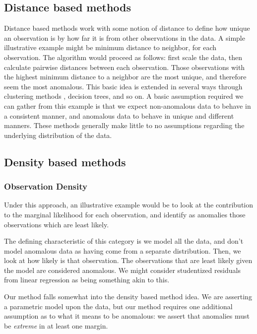 \subsection{Distance based methods}
Distance based methods work with some notion of distance to define how unique an
  observation is by how far it is from other observations in the data.  A simple
  illustrative example might be minimum distance to neighbor, for each
  observation.  The algorithm would proceed as follows: first scale the data,
  then calculate pairwise distances between each observation. Those observations
  with the highest minimum distance to a neighbor are the most unique, and
  therefore seem the most anomalous.   This basic idea is extended in several ways through
  clustering methods , decision
  trees, and so on.  A basic
  assumption required we can gather from this example is that we expect
  non-anomalous data to behave in a consistent manner, and anomalous data to
  behave in unique and different manners.  These methods generally make little
  to no assumptions regarding the underlying distribution of the data.


\subsection{Density based methods}


\subsubsection{Observation Density}
Under this approach, an illustrative example would be to look at the
  contribution to the marginal likelihood for each observation, and identify as
  anomalies those observations which are least likely.


The defining characteristic of this category is we model all the data, and don't
  model anomalous data as having come from a separate distribution.  Then, we
  look at how likely is that observation.  The observations that are least
  likely given the model are considered anomalous.  We might consider
  studentized residuals from linear regression as being something akin to this.

Our method falls somewhat into the density based method idea.  We are asserting
  a parametric model upon the data, but our method requires one additional
  assumption as to what it means to be anomalous: we assert that anomalies must
  be \emph{extreme} in at least one margin.

